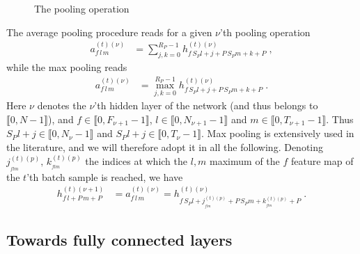 \begin{figure}[H]
\begin{center}
\caption{The pooling operation}
\end{center}
\end{figure}

The average pooling procedure reads for a given $\nu$'th pooling operation
\begin{align}
a_{f\,l\,m}^{(t)(\nu)}&=\sum^{R_P-1}_{j,k=0} h_{f\,S_P l+j+P\,S_Pm+k+P}^{(t)(\nu)}\;,
\end{align}
while the max pooling reads
\begin{align}
a_{f\,l\,m}^{(t)(\nu)}&=\max^{R_P-1}_{j,k=0} h_{f\,S_P l+j+P\,S_Pm+k+P}^{(t)(\nu)}\;.
\end{align}
Here $\nu$ denotes the $\nu$'th hidden layer of the network (and thus belongs to $\llbracket0,N-1 \rrbracket$), and $f\in\llbracket0,F_{\nu+1}-1\rrbracket$, $l\in\llbracket0,N_{\nu+1}-1 \rrbracket$ and $m\in\llbracket0,T_{\nu+1}-1 \rrbracket$. Thus $S_Pl+j\in\llbracket0,N_\nu-1 \rrbracket$ and $S_Pl+j\in\llbracket0,T_\nu-1 \rrbracket$. Max pooling is extensively used in the literature, and we will therefore adopt it in all the following. Denoting $j^{(t)(p)}_{_{flm}},\,k^{(t)(p)}_{_{flm}}$ the indices at which the $l,m$ maximum  of the $f$ feature map of the $t$'th batch sample is reached, we have
\begin{align}
h_{f\,l+P\,m+P}^{(t)(\nu+1)}&=a_{f\,l\,m}^{(t)(\nu)}=
%
h^{(t)(\nu)}_{f\,S_P l+j^{(t)(p)}_{_{flm}}+P\,S_Pm+k^{(t)(p)}_{_{flm}}+P}\;.
\end{align}

\subsection{Towards fully connected layers}

